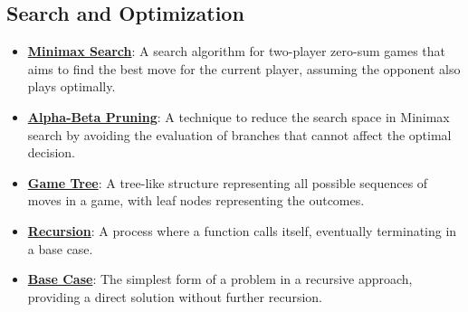 \documentclass{article}%
\begin{document}
\subsection{Search and Optimization}%
\label{subsec:SearchandOptimization}%
\begin{itemize}[leftmargin=*]%
\item \href{https://purdue.brightspace.com/d2l/common/assets/pdfjs-d2l-dist/1.0.14-legacy/web/viewer.html?file=\%2Fcontent\%2Fenforced\%2F1095467-wl.202510.CS.24300.001\%2F02L2-Intro.pdf\%3Fou\%3D1095467\&lang=en-us\&container=d2l-fileviewer-rendered-pdf\&fullscreen=d2l-fileviewer-rendered-pdf-dialog\&height=667#page=22}{\textbf{Minimax Search}}: A search algorithm for two-player zero-sum games that aims to find the best move for the current player, assuming the opponent also plays optimally.%
\item \href{https://purdue.brightspace.com/d2l/common/assets/pdfjs-d2l-dist/1.0.14-legacy/web/viewer.html?file=\%2Fcontent\%2Fenforced\%2F1095467-wl.202510.CS.24300.001\%2F02L2-Intro.pdf\%3Fou\%3D1095467\&lang=en-us\&container=d2l-fileviewer-rendered-pdf\&fullscreen=d2l-fileviewer-rendered-pdf-dialog\&height=667#page=23}{\textbf{Alpha-Beta Pruning}}: A technique to reduce the search space in Minimax search by avoiding the evaluation of branches that cannot affect the optimal decision.%
\item \href{https://purdue.brightspace.com/d2l/common/assets/pdfjs-d2l-dist/1.0.14-legacy/web/viewer.html?file=\%2Fcontent\%2Fenforced\%2F1095467-wl.202510.CS.24300.001\%2F02L2-Intro.pdf\%3Fou\%3D1095467\&lang=en-us\&container=d2l-fileviewer-rendered-pdf\&fullscreen=d2l-fileviewer-rendered-pdf-dialog\&height=667#page=11}{\textbf{Game Tree}}: A tree-like structure representing all possible sequences of moves in a game, with leaf nodes representing the outcomes.%
\item \href{https://purdue.brightspace.com/d2l/common/assets/pdfjs-d2l-dist/1.0.14-legacy/web/viewer.html?file=\%2Fcontent\%2Fenforced\%2F1095467-wl.202510.CS.24300.001\%2F14L1-DepthFS.pdf\%3Fou\%3D1095467\&lang=en-us\&container=d2l-fileviewer-rendered-pdf\&fullscreen=d2l-fileviewer-rendered-pdf-dialog\&height=667#page=2}{\textbf{Recursion}}: A process where a function calls itself, eventually terminating in a base case.%
\item \href{https://purdue.brightspace.com/d2l/common/assets/pdfjs-d2l-dist/1.0.14-legacy/web/viewer.html?file=\%2Fcontent\%2Fenforced\%2F1095467-wl.202510.CS.24300.001\%2F14L1-DepthFS.pdf\%3Fou\%3D1095467\&lang=en-us\&container=d2l-fileviewer-rendered-pdf\&fullscreen=d2l-fileviewer-rendered-pdf-dialog\&height=667#page=5}{\textbf{Base Case}}: The simplest form of a problem in a recursive approach, providing a direct solution without further recursion.%

\end{itemize}
\end{document}
